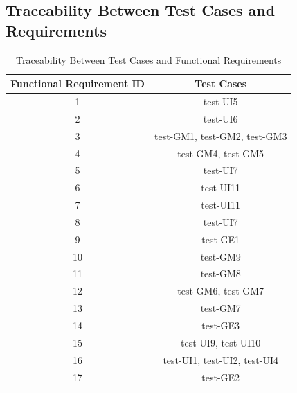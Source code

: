 \documentclass[12pt, titlepage]{article}
\begin{document}
\subsection{Traceability Between Test Cases and Requirements}
\begin{table}[H]
  \begin{center}
    \caption{Traceability Between Test Cases and Functional Requirements }
    \label{tab:table1}
    \begin{tabular}{c|c} 
        \toprule
        \textbf{Functional Requirement ID} & \textbf{Test Cases}\\
        \midrule
        1 & test-UI5\\
        \hline
        2 & test-UI6\\
        \hline
        3 & test-GM1, test-GM2, test-GM3 \\
        \hline
        4 & test-GM4, test-GM5\\
        \hline
        5 & test-UI7\\
        \hline
        6 & test-UI11\\
        \hline
        7 &  test-UI11\\
        \hline
        8 & test-UI7\\
        \hline
        9 & test-GE1\\
        \hline
        10 & test-GM9 \\
        \hline
        11 & test-GM8\\
        \hline
        12 & test-GM6, test-GM7\\
        \hline
        13 & test-GM7\\
        \hline
        14 & test-GE3\\
        \hline
        15 & test-UI9, test-UI10\\
        \hline
        16 & test-UI1, test-UI2, test-UI4\\
        \hline
        17 & test-GE2\\
        \bottomrule
    \end{tabular}
  \end{center}
\end{table}
\end{document}
